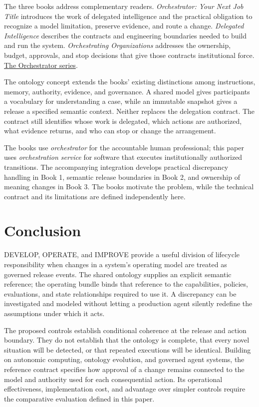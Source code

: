 \documentclass[preprint,12pt,authoryear]{elsarticle}
\begin{document}
The three books address complementary readers. \emph{Orchestrator: Your
Next Job Title} introduces the work of delegated intelligence and the
practical obligation to recognize a model limitation, preserve evidence,
and route a change. \emph{Delegated Intelligence} describes the
contracts and engineering boundaries needed to build and run the system.
\emph{Orchestrating Organizations} addresses the ownership, budget,
approvals, and stop decisions that give those contracts institutional
force. \href{https://readorchestrator.com}{The Orchestrator series}.

The ontology concept extends the books' existing distinctions among
instructions, memory, authority, evidence, and governance. A shared
model gives participants a vocabulary for understanding a case, while an
immutable snapshot gives a release a specified semantic context. Neither
replaces the delegation contract. The contract still identifies whose
work is delegated, which actions are authorized, what evidence returns,
and who can stop or change the arrangement.

The books use \emph{orchestrator} for the accountable human
professional; this paper uses \emph{orchestration service} for software
that executes institutionally authorized transitions. The accompanying
integration develops practical discrepancy handling in Book 1, semantic
release boundaries in Book 2, and ownership of meaning changes in Book
3. The books motivate the problem, while the technical contract and its
limitations are defined independently here.

\section{Conclusion}\label{conclusion}

DEVELOP, OPERATE, and IMPROVE provide a useful division of lifecycle
responsibility when changes in a system's operating model are treated as
governed release events. The shared ontology supplies an explicit
semantic reference; the operating bundle binds that reference to the
capabilities, policies, evaluations, and state relationships required to
use it. A discrepancy can be investigated and modeled without letting a
production agent silently redefine the assumptions under which it acts.

The proposed controls establish conditional coherence at the release and
action boundary. They do not establish that the ontology is complete,
that every novel situation will be detected, or that repeated executions
will be identical. Building on autonomic computing, ontology evolution,
and governed agent systems, the reference contract specifies how
approval of a change remains connected to the model and authority used
for each consequential action. Its operational effectiveness,
implementation cost, and advantage over simpler controls require the
comparative evaluation defined in this paper.
\end{document}
